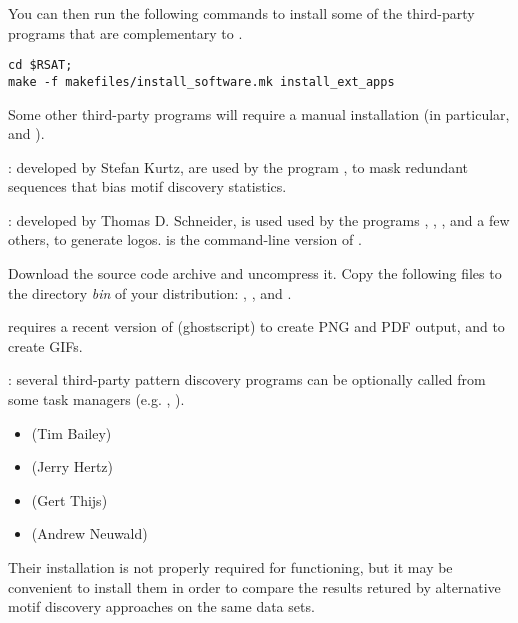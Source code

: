 \documentclass[12pt,a4paper, oneside]{scrreprt} %
\begin{document}
You can then run the following commands to install some of the
third-party programs that are complementary to \RSAT.

\begin{lstlisting}
cd $RSAT;
make -f makefiles/install_software.mk install_ext_apps
\end{lstlisting}

Some other third-party programs will require a manual installation (in
particular,  and ).


\begin{description}
\item[ and ]: developed by Stefan
  Kurtz, are used by the program , to mask
  redundant sequences that bias motif discovery statistics.

\item[]: developed by Thomas D. Schneider, is used
  used by the programs ,
  , ,
   and a few others, to generate
  logos.  is the command-line version of
  .

  Download the source code archive and uncompress it. Copy the
  following files to the directory \emph{bin} of your \RSAT
  distribution: , ,  and
  .

\item {} requires a recent version of 
  (ghostscript) to create PNG and
  PDF output, and  to create GIFs.

\item[matrix-based pattern discovery]: several third-party pattern
  discovery programs can be optionally called from some \RSAT task
  managers (e.g. ,
  ). 
  \begin{itemize}
  \item {} (Tim Bailey)
  \item {} (Jerry Hertz)
  \item {} (Gert Thijs)
  \item {} (Andrew Neuwald)
  \end{itemize}

  Their installation is not properly required for \RSAT functioning,
  but it may be convenient to install them in order to compare the
  results retured by alternative motif discovery approaches on the
  same data sets.
\end{description}
\end{document}
